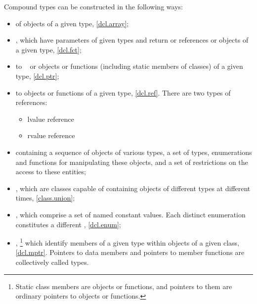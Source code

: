 \pnum
{}%
Compound types can be constructed in the following ways:
\begin{itemize}
\item {} of objects of a given type, \ref{dcl.array};

\item {}, which have parameters of given types and return
 or references or objects of a given type, \ref{dcl.fct};

\item {} to \cv{}~ or objects or functions (including
static members of classes) of a given type, \ref{dcl.ptr};

\item
{}%
%
 to objects or functions of a given
type, \ref{dcl.ref}. There are two types of references:
\begin{itemize}
\item lvalue reference
\item rvalue reference
\end{itemize}

\item
{} containing a sequence of objects of various types,
a set of types, enumerations and functions for
manipulating these objects, and a set of restrictions
on the access to these entities;

\item
{}, which are classes capable of containing objects of
different types at different times, \ref{class.union};

\item
{}, which comprise a set of named constant values.
Each distinct enumeration constitutes a different
, \ref{dcl.enum};

\item
{}%
,%
\footnote{Static class members are objects or functions, and pointers to them are
ordinary pointers to objects or functions.}
which identify members of a given
type within objects of a given class, \ref{dcl.mptr}.
Pointers to data members and pointers to member functions are collectively
called  types.
\end{itemize}

